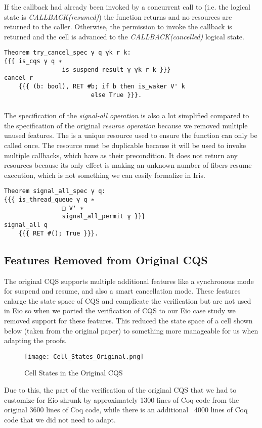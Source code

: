 If the callback had already been invoked by a concurrent call to  (i.e. the logical state is \textit{CALLBACK(resumed)}) the function returns  and no resources are returned to the caller.
Otherwise, the permission to invoke the callback is returned and the cell is advanced to the \textit{CALLBACK(cancelled)} logical state.

\begin{verbatim}
Theorem try_cancel_spec γ q γk r k:
{{{ is_cqs γ q ∗
                is_suspend_result γ γk r k }}}
cancel r
    {{{ (b: bool), RET #b; if b then is_waker V' k
                        else True }}}.
\end{verbatim}

\subsubsection{}
\label{sec:cqs-spec-signal-all}

The specification of the \textit{signal-all operation} is also a lot simplified compared to the specification of the original \textit{resume operation} because we removed multiple unused features.
The \gssignal{} is a unique resource used to ensure the function can only be called once.
The  resource must be duplicable because it will be used to invoke multiple callbacks, which have  as their precondition.
It does not return any resources because its only effect is making an unknown number of fibers resume execution, which is not something we can easily formalize in Iris.

\begin{verbatim}
Theorem signal_all_spec γ q:
{{{ is_thread_queue γ q ∗
                □ V' ∗
                signal_all_permit γ }}}
signal_all q
    {{{ RET #(); True }}}.
\end{verbatim}

\subsection{Features Removed from Original CQS}
\label{sec:cqs-spec-removed-features}

The original CQS supports multiple additional features like a synchronous mode for suspend and resume, and also a smart cancellation mode.
These features enlarge the state space of CQS and complicate the verification but are not used in Eio so when we ported the verification of CQS to our Eio case study we removed support for these features.
This reduced the state space of a cell shown below (taken from the original paper) to something more manageable for us when adapting the proofs.

\begin{figure}[ht]
  \texttt{[image: Cell\_States\_Original.png]}
  \caption{Cell States in the Original CQS}
\end{figure}

Due to this, the part of the verification of the original CQS that we had to customize for Eio shrunk by approximately 1300 lines of Coq code from the original 3600 lines of Coq code, while there is an additional ~4000 lines of Coq code that we did not need to adapt.
